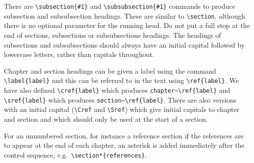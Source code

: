 There are \verb"\subsection{#1}" and \verb"\subsubsection{#1}" commands to
produce subsection and subsubsection headings. These are similar  to
\verb"\section", although there is no optional parameter for the running
head. Do not put a full stop at the end of sections, subsections or
subsubsections headings. The headings of subsections
and subsubsections  should always have an initial capital followed by 
lowercase letters, rather than capitals throughout.

Chapter and section  headings can be given 
a label using the command \verb"\label{label}" and 
this can be referred to in the text using \verb"\ref{label}".
We have also defined \verb"\cref{label}" which produces
\verb"chapter~\ref{label}" and \verb"\sref{label}" which produces 
\verb"section~\ref{label}". 
There are also versions with an initial capital
(\verb"\Cref" and \verb"\Sref") which give initial capitals to chapter and
section and which should only be used at the start of a section.

For an unnumbered section, for instance a reference section if the
references are to appear at the end of each chapter, an asterisk is added
immediately after the control sequence, e.g.\ \verb"\section*{references}". 


